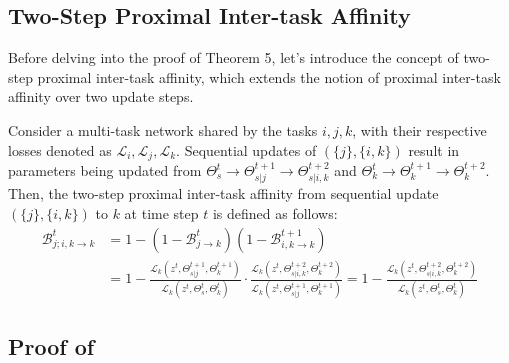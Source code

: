  
\subsection{Two-Step Proximal Inter-task Affinity}
\label{Append:two_step_proximal_inter_task_affinity}

Before delving into the proof of Theorem 5, let's introduce the concept of two-step proximal inter-task affinity, which extends the notion of proximal inter-task affinity over two update steps.
\begin{definition} Consider a multi-task network shared by the tasks $i, j, k$, with their respective losses denoted as $\mathcal{L}_i, \mathcal{L}_j, \mathcal{L}_k$. Sequential updates of $(\{j\}, \{i, k\})$ result in parameters being updated from $\Theta_s^{t} \rightarrow \Theta_{s|j}^{t+1} \rightarrow \Theta_{s|i,k}^{t+2}$ and $\Theta_k^{t} \rightarrow \Theta_k^{t+1} \rightarrow \Theta_k^{t+2}$. Then, the two-step proximal inter-task affinity from sequential update $(\{j\}, \{i, k\})$ to $k$ at time step $t$ is defined as follows:
\begin{align}
    \mathcal{B}^t_{j; i,k\rightarrow k} &= 1-(1-\mathcal{B}^t_{j\rightarrow k})(1-\mathcal{B}^{t+1}_{i,k\rightarrow k}) \\
    &= 1-\frac{\mathcal{L}_k(z^t, \Theta_{s|j}^{t+1}, \Theta_k^{t+1})}{\mathcal{L}_k(z^t, \Theta_s^{t}, \Theta_k^{t})} \cdot \frac{\mathcal{L}_k(z^t, \Theta_{s|i,k}^{t+2}, \Theta_k^{t+2})}{\mathcal{L}_k(z^t, \Theta_{s|j}^{t+1}, \Theta_k^{t+1})} = 1-\frac{\mathcal{L}_k(z^t, \Theta_{s|i,k}^{t+2}, \Theta_k^{t+2})}{\mathcal{L}_k(z^t, \Theta_s^{t}, \Theta_k^{t})}
\end{align}
\end{definition}

\subsection{Proof of }
\label{Append:theorem5}

